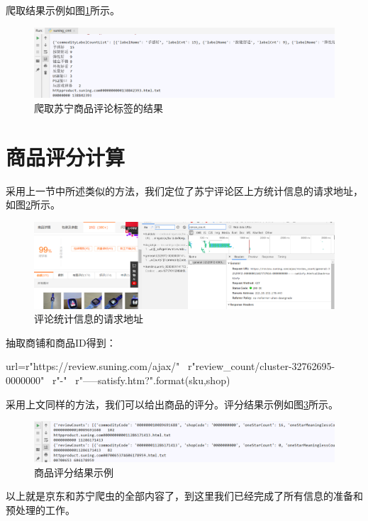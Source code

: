 爬取结果示例如图\ref{img:yhb100}所示。

\begin{figure}[htbp]
\centering
\includegraphics[width=13.5cm]{img/yhb/sn_res1.png}
\caption{爬取苏宁商品评论标签的结果}
\label{img:yhb100}   %
\end{figure}

\section{商品评分计算}

采用上一节中所述类似的方法，我们定位了苏宁评论区上方统计信息的请求地址，如图\ref{img:yhb121}所示。

\begin{figure}[htbp]
\centering
\includegraphics[width=13.5cm]{img/yhb/sn_eg.png}
\caption{评论统计信息的请求地址}
\label{img:yhb121}   %
\end{figure}

抽取商铺和商品ID得到：
\begin{python}
url=r"https://review.suning.com/ajax/" \
        r"review_count/cluster-32762695-0000000" \
        r"{}-{}" \
        r"-----satisfy.htm?".format(sku,shop)
\end{python}

采用上文同样的方法，我们可以给出商品的评分。评分结果示例如图\ref{img:yhb101}所示。

\begin{figure}[htbp]
\centering
\includegraphics[width=13.5cm]{img/yhb/sn_res2.png}
\caption{商品评分结果示例}
\label{img:yhb101}   %
\end{figure}

以上就是京东和苏宁爬虫的全部内容了，到这里我们已经完成了所有信息的准备和预处理的工作。




